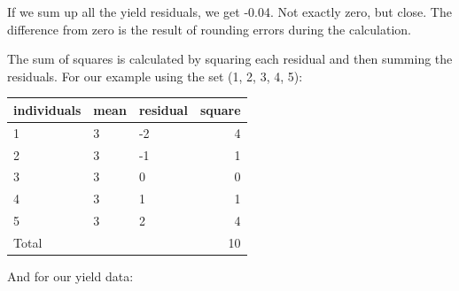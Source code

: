 \documentclass[
]{book}
\newenvironment{Shaded}{\begin{snugshade}}{\end{snugshade}}
\newcommand{\AttributeTok}[1]{\textcolor[rgb]{0.77,0.63,0.00}{#1}}
\newcommand{\DecValTok}[1]{\textcolor[rgb]{0.00,0.00,0.81}{#1}}
\newcommand{\FunctionTok}[1]{\textcolor[rgb]{0.00,0.00,0.00}{#1}}
\newcommand{\NormalTok}[1]{#1}
\newcommand{\OtherTok}[1]{\textcolor[rgb]{0.56,0.35,0.01}{#1}}
\newcommand{\SpecialCharTok}[1]{\textcolor[rgb]{0.00,0.00,0.00}{#1}}
\newcommand{\StringTok}[1]{\textcolor[rgb]{0.31,0.60,0.02}{#1}}
\begin{document}
If we sum up all the yield residuals, we get -0.04. Not exactly zero,
but close. The difference from zero is the result of rounding errors
during the calculation.

The sum of squares is calculated by squaring each residual and then
summing the residuals. For our example using the set (1, 2, 3, 4, 5):

\begin{Shaded}
\end{Shaded}

\begin{tabular}[t]{l|l|l|r}
\hline
individuals & mean & residual & square\\
\hline
1 & 3 & -2 & 4\\
\hline
2 & 3 & -1 & 1\\
\hline
3 & 3 & 0 & 0\\
\hline
4 & 3 & 1 & 1\\
\hline
5 & 3 & 2 & 4\\
\hline
Total &  &  & 10\\
\hline
\end{tabular}

And for our yield data:
\end{document}

